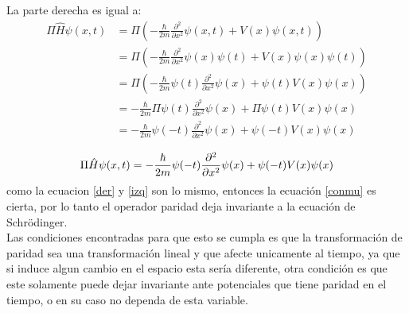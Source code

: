\documentclass[12pt,letterpaper]{article}
\begin{document}
La parte derecha es igual a:
\begin{align*}
\Pi\hat{H}\psi(x,t) & =\Pi\left(-\frac{\hbar}{2m}\frac{\partial^2}{\partial x^2} \psi(x,t) +V(x)\psi(x,t)\right)\\
                    &=\Pi\left(-\frac{\hbar}{2m}\frac{\partial^2}{\partial x^2} \psi(x)\psi(t) +V(x)\psi(x)\psi(t)\right)\\
                    &=\Pi\left(-\frac{\hbar}{2m}\psi(t)\frac{\partial^2}{\partial x^2} \psi(x) + \psi(t)V(x)\psi(x)\right)\\
                    &=-\frac{\hbar}{2m}\Pi\psi(t)\frac{\partial^2}{\partial x^2} \psi(x) + \Pi\psi(t)V(x)\psi(x)\\
                    &=-\frac{\hbar}{2m}\psi(-t)\frac{\partial^2}{\partial x^2} \psi(x) + \psi(-t)V(x)\psi(x)\\
    \end{align*}
\begin{equation}
\Pi\hat{H} \psi(x,t)=-\frac{\hbar}{2m}\psi(-t)\frac{\partial^2}{\partial x^2} \psi(x) + \psi(-t)V(x)\psi(x)\\
\label{der}
\end{equation}
como la ecuacion \ref{der} y \ref{izq} son lo mismo, entonces la ecuación \ref{conmu} es cierta, por lo tanto el operador paridad deja invariante a la ecuación de Schr\"odinger.\\
Las condiciones encontradas para que esto se cumpla es que la transformación de paridad sea una transformación lineal y que afecte unicamente al tiempo, ya que si induce algun cambio en el espacio esta sería diferente, otra condición es que este solamente puede dejar invariante ante potenciales que tiene paridad en el tiempo, o en su caso no dependa de esta variable.
\end{document}
